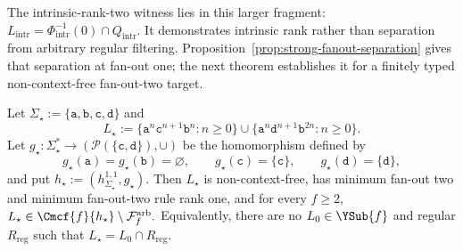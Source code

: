 The intrinsic-rank-two witness lies in this larger
fragment:
\(L_{\mathrm{intr}}=\Phi_{\mathrm{intr}}^{-1}(0)\cap Q_{\mathrm{intr}}.\)
It demonstrates intrinsic rank rather than
separation from arbitrary regular filtering.
Proposition~\ref{prop:strong-fanout-separation}
gives that separation at fan-out one;
the next theorem establishes it for a
finitely typed non-context-free fan-out-two target.

\begin{theorem}
\label{thm:arbitrary-filter-separation}
Let $\Sigma_\star:=\{\mathtt a,\mathtt b,\mathtt c,\mathtt d\}$ and
\[
 L_\star
 :=\{\mathtt a^n\mathtt c^{n+1}\mathtt b^n:n\ge0\}
   \cup
   \{\mathtt a^n\mathtt d^{n+1}\mathtt b^{2n}:n\ge0\}.
\]
Let
$g_\star:\Sigma_\star^*\to(\mathcal P(\{\mathtt c,\mathtt d\}),\cup)$
be the homomorphism defined by
\[
 g_\star(\mathtt a)=g_\star(\mathtt b)=\varnothing,
 \qquad
 g_\star(\mathtt c)=\{\mathtt c\},
 \qquad
 g_\star(\mathtt d)=\{\mathtt d\},
\]
and put
\(h_\star:=(h_{\Sigma_\star}^{1,1},g_\star).\)
Then $L_\star$ is non-context-free, has minimum fan-out two and minimum
fan-out-two rule rank one, and for every $f\ge2$,
\(L_\star\in\Cmcf{f}{h_\star} \setminus\mathcal F_f^{\mathrm{arb}}.\)
Equivalently, there are no $L_0\in\YSub{f}$ and regular $R_{\mathrm{reg}}$ such that
$L_\star=L_0\cap R_{\mathrm{reg}}$.
\end{theorem}

